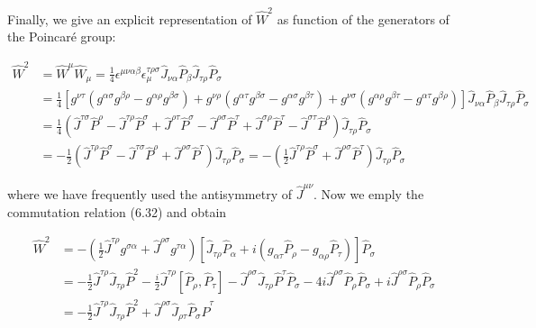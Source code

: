 \documentclass[10pt, letterpaper]{article}
\begin{document}
Finally, we give an explicit representation of $\hat{W}^{2}$ as function of the generators of the Poincaré group:

$$
\begin{aligned}
\hat{W}^{2} & =\hat{W}^{\mu} \hat{W}_{\mu}=\frac{1}{4} \epsilon^{\mu \nu \alpha \beta} \epsilon_{\mu}^{\tau \rho \sigma} \hat{J}_{\nu \alpha} \hat{P}_{\beta} \hat{J}_{\tau \rho} \hat{P}_{\sigma} \\
& =\frac{1}{4}\left[g^{\nu \tau}\left(g^{\alpha \sigma} g^{\beta \rho}-g^{\alpha \rho} g^{\beta \sigma}\right)+g^{\nu \rho}\left(g^{\alpha \tau} g^{\beta \sigma}-g^{\alpha \sigma} g^{\beta \tau}\right)+g^{\nu \sigma}\left(g^{\alpha \rho} g^{\beta \tau}-g^{\alpha \tau} g^{\beta \rho}\right)\right] \hat{J}_{\nu \alpha} \hat{P}_{\beta} \hat{J}_{\tau \rho} \hat{P}_{\sigma} \\
& =\frac{1}{4}\left(\hat{J}^{\tau \sigma} \hat{P}^{\rho}-\hat{J}^{\tau \rho} \hat{P}^{\sigma}+\hat{J}^{\rho \tau} \hat{P}^{\sigma}-\hat{J}^{\rho \sigma} \hat{P}^{\tau}+\hat{J}^{\sigma \rho} \hat{P}^{\tau}-\hat{J}^{\sigma \tau} \hat{P}^{\rho}\right) \hat{J}_{\tau \rho} \hat{P}_{\sigma} \\
& =-\frac{1}{2}\left(\hat{J}^{\tau \rho} \hat{P}^{\sigma}-\hat{J}^{\tau \sigma} \hat{P}^{\rho}+\hat{J}^{\rho \sigma} \hat{P}^{\tau}\right) \hat{J}_{\tau \rho} \hat{P}_{\sigma}=-\left(\frac{1}{2} \hat{J}^{\tau \rho} \hat{P}^{\sigma}+\hat{J}^{\rho \sigma} \hat{P}^{\tau}\right) \hat{J}_{\tau \rho} \hat{P}_{\sigma}
\end{aligned}
$$

where we have frequently used the antisymmetry of $\hat{J}^{\mu \nu}$. Now we emply the commutation relation (6.32) and obtain

$$
\begin{aligned}
\hat{W}^{2} & =-\left(\frac{1}{2} \hat{J}^{\tau \rho} g^{\sigma \alpha}+\hat{J}^{\rho \sigma} g^{\tau \alpha}\right)\left[\hat{J}_{\tau \rho} \hat{P}_{\alpha}+i\left(g_{\alpha \tau} \hat{P}_{\rho}-g_{\alpha \rho} \hat{P}_{\tau}\right)\right] \hat{P}_{\sigma} \\
& =-\frac{1}{2} \hat{J}^{\tau \rho} \hat{J}_{\tau \rho} \hat{P}^{2}-\frac{i}{2} \hat{J}^{\tau \rho}\left[\hat{P}_{\rho}, \hat{P}_{\tau}\right]-\hat{J}^{\rho \sigma} \hat{J}_{\tau \rho} \hat{P}^{\tau} \hat{P}_{\sigma}-4 i \hat{J}^{\rho \sigma} \hat{P}_{\rho} \hat{P}_{\sigma}+i \hat{J}^{\rho \sigma} \hat{P}_{\rho} \hat{P}_{\sigma} \\
& =-\frac{1}{2} \hat{J}^{\tau \rho} \hat{J}_{\tau \rho} \hat{P}^{2}+\hat{J}^{\rho \sigma} \hat{J}_{\rho \tau} \hat{P}_{\sigma} \hat{P}^{\tau}
\end{aligned}
$$
\end{document}
